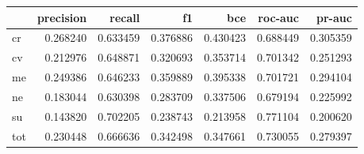 \begin{tabular}{lrrrrrr}
\toprule
{} &  precision &    recall &        f1 &       bce &   roc-auc &    pr-auc \\
\midrule
cr  &   0.268240 &  0.633459 &  0.376886 &  0.430423 &  0.688449 &  0.305359 \\
cv  &   0.212976 &  0.648871 &  0.320693 &  0.353714 &  0.701342 &  0.251293 \\
me  &   0.249386 &  0.646233 &  0.359889 &  0.395338 &  0.701721 &  0.294104 \\
ne  &   0.183044 &  0.630398 &  0.283709 &  0.337506 &  0.679194 &  0.225992 \\
su  &   0.143820 &  0.702205 &  0.238743 &  0.213958 &  0.771104 &  0.200620 \\
tot &   0.230448 &  0.666636 &  0.342498 &  0.347661 &  0.730055 &  0.279397 \\
\bottomrule
\end{tabular}
